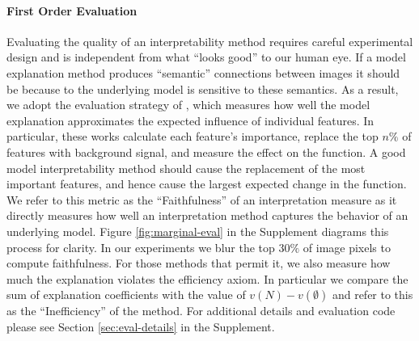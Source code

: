 \documentclass{article} %
\begin{document}
\paragraph{First Order Evaluation} Evaluating the quality of an interpretability method requires careful experimental design and is independent from what ``looks good'' to our human eye. If a model explanation method produces ``semantic'' connections between images it should be because to the underlying model is sensitive to these semantics. As a result, we adopt the evaluation strategy of \cite{shap}, which measures how well the model explanation approximates the expected influence of individual features. In particular, these works calculate each feature’s importance, replace the top $n\%$ of features with background signal, and measure the effect on the function. A good model interpretability method should cause the replacement of the most important features, and hence cause the largest expected change in the function. We refer to this metric as the ``Faithfulness'' of an interpretation measure as it directly measures how well an interpretation method captures the behavior of an underlying model. Figure \ref{fig:marginal-eval} in the Supplement diagrams this process for clarity. In our experiments we blur the top $30\%$ of image pixels to compute faithfulness. For those methods that permit it, we also measure how much the explanation violates the efficiency axiom. In particular we compare the sum of explanation coefficients with the value of $v(N) - v(\emptyset)$ and refer to this as the ``Inefficiency'' of the method. For additional details and evaluation code please see Section \ref{sec:eval-details} in the Supplement. 
\vspace{-0.15in}
\end{document}
